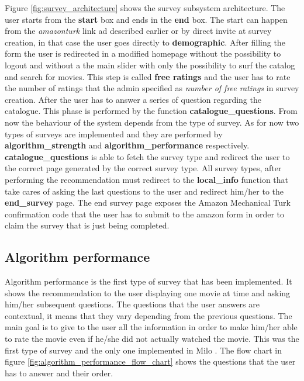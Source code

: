 Figure \ref{fig:survey_architecture} shows the survey subsystem architecture. The user starts from the \textbf{start} box and ends in the \textbf{end} box. The start can happen from the \textit{amazonturk} link ad described earlier or by direct invite at survey creation, in that case the user goes directly to \textbf{demographic}. After filling the form the user is redirected in a modified homepage without the possibility to logout and without a the main slider with only the possibility to surf the catalog and search for movies. This step is called \textbf{free ratings} and the user has to rate the number of ratings that the admin specified as \textit{number of free ratings} in survey creation. After the user has to answer a series of question regarding the catalogue. This phase is performed by the function \textbf{catalogue\_questions}. From now the behaviour of the system depends from the type of survey. As for now two types of surveys are implemented and they are performed by \textbf{algorithm\_strength} and \textbf{algorithm\_performance} respectively. \textbf{catalogue\_questions} is able to fetch the survey type and redirect the user to the correct page generated by the correct survey type. All survey types, after performing the recommendation must redirect to the \textbf{local\_info} function that take cares of asking the last questions to the user and redirect him/her to the \textbf{end\_survey} page. The end survey page exposes the Amazon Mechanical Turk confirmation code that the user has to submit to the amazon form in order to claim the survey that is just being completed. 

\subsection{Algorithm performance}
\label{sec:algorithm_performance}

Algorithm performance is the first type of survey that has been implemented. It shows the recommendation to the user displaying one movie at time and asking him/her subsequent questions. The questions that the user answers are contextual, it means that they vary depending from the previous questions. The main goal is to give to the user all the information in order to make him/her able to rate the movie even if he/she did not actually watched the movie.
This was the first type of survey and the only one implemented in Milo \cite{thesis-andreia}. The flow chart in figure \ref{fig:algorithm_performance_flow_chart} shows the questions that the user has to answer and their order.

